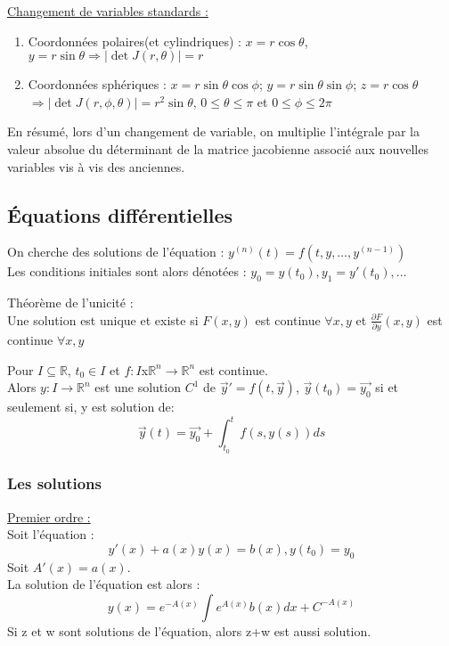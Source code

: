\documentclass[../main.tex]{subfiles}
\begin{document}
\quad \underline{Changement de variables standards :}\\
\begin{enumerate}
    \item Coordonnées polaires(et cylindriques) : $x=r \cos{\theta}$, $y=r\sin{\theta} \Rightarrow |\det J(r, \theta)| = r$\\
    \item Coordonnées sphériques : $x=r\sin{\theta} \cos{\phi}$; $y=r\sin{\theta} \sin{\phi}$; $z=r\cos{\theta}$ $\Rightarrow |\det J(r, \phi, \theta) | = r^2 \sin{\theta}$, $0\leq \theta \leq \pi$ et $0\leq \phi \leq 2\pi$\\
\end{enumerate}

En résumé, lors d'un changement de variable, on multiplie l'intégrale par la valeur absolue du déterminant de la matrice jacobienne associé aux nouvelles variables vis à vis des anciennes.\\

\subsection{Équations différentielles}
On cherche des solutions de l'équation : $y^{(n)}(t) = f(t, y, \dots, y^{(n-1)})$\\
Les conditions initiales sont alors dénotées : $y_0 = y(t_0), y_1 = y'(t_0), \dots$\\

\begin{theorem}Théorème de l'unicité :\\
Une solution est unique et existe si $F(x,y)$ est continue $\forall x,y$ et $\frac{\partial F}{\partial y}(x,y)$ est continue $\forall x,y$\end{theorem}

Pour $I\subseteq \mathbb{R}$, $t_0 \in I$ et $f:I$x$\mathbb{R}^n\rightarrow\mathbb{R}^n$ est continue.\\
Alors $y:I\rightarrow \mathbb{R}^n$ est une solution $C^1$ de $\vec{y}'=f(t, \vec{y})$, $\vec{y}(t_0) = \vec{y_0}$ si et seulement si, y est solution de:\\
\begin{equation}
    \vec{y}(t) = \vec{y_0} + \int_{t_0}^t f(s, y(s)) ds
\end{equation}

\subsubsection{Les solutions}
\quad \underline{Premier ordre :}\\
Soit l'équation :\\
\begin{equation}
    y'(x) +a(x) y(x) = b(x), y(t_0) = y_0
\end{equation}
Soit $A'(x) = a(x)$.\\
La solution de l'équation est alors :\\
\begin{equation}
    y(x) = e^{-A(x)} \int e^{A(x)} b(x) dx+ C^{-A(x)}
\end{equation}
\warning Si z et w sont solutions de l'équation, alors z+w est aussi solution.\\
\end{document}
